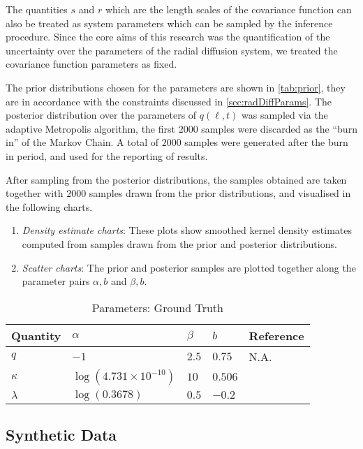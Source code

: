 The quantities $s$ and $r$ which are the length scales of the covariance function can also be 
treated as system parameters which can be sampled by the inference procedure. Since the core aims 
of this research was the quantification of the uncertainty over the parameters of the radial 
diffusion system, we treated the covariance function parameters as fixed.

The prior distributions chosen for the parameters are shown in \cref{tab:prior}, they are in 
accordance with the constraints discussed in \cref{sec:radDiffParams}. The posterior 
distribution over the parameters of $q(\ell, t)$ was sampled via the adaptive Metropolis algorithm, 
the first $2000$ samples were discarded as the \enquote{burn in} of the Markov Chain. A total of 
$2000$ samples were generated after the burn in period, and used for the reporting of results.

After sampling from the posterior distributions, the samples obtained are taken together with 
$2000$ samples drawn from the prior distributions, and visualised in the following charts.
\begin{enumerate}
  \item \emph{Density estimate charts}: These plots show smoothed kernel density estimates computed 
        from samples drawn from the prior and posterior distributions.
  \item \emph{Scatter charts}: The prior and posterior samples are plotted together along the 
        parameter pairs $\alpha, b$ and $\beta, b$.
\end{enumerate}


\begin{table}[ht]
  \caption{Parameters: Ground Truth}
  \label{tab:ground-truth}
  \centering
  \begin{tabular}{lllll}
    \hline
    \textbf{Quantity}  & $\alpha$ & $\beta$ & $b$ & Reference\\
    \hline
    $q$ & $-1$  & $2.5$ & $0.75$ & N.A. \\
    $\kappa$  & $\log(4.731 \times 10^{-10})$ & $10$ & $0.506$ & \citet{JGRA:JGRA15067} \\
    $\lambda$ & $\log(0.3678)$ & $0.5$ & $-0.2$ & \citet{GRL:GRL22815} \\
    \hline
  \end{tabular}
\end{table}

\subsection{Synthetic Data}\label{sec:syntheticDataQ}

